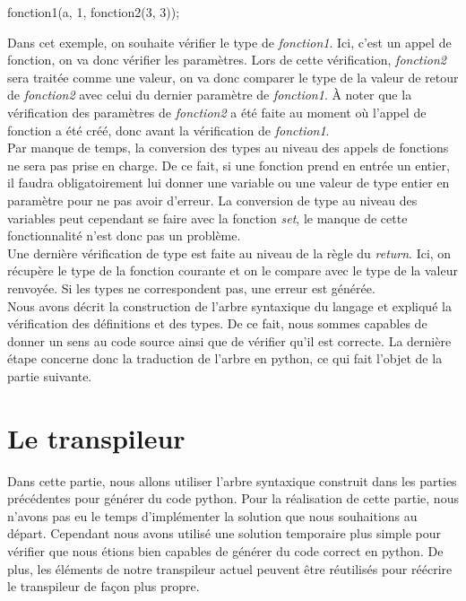 \documentclass[a4paper]{article}%
\begin{document}
\begin{grammar}[language=C++]
  fonction1(a, 1, fonction2(3, 3));
\end{grammar}\leavevmode\newline

Dans cet exemple, on souhaite vérifier le type de \textit{fonction1}. Ici,
c'est un appel de fonction, on va donc vérifier les paramètres. Lors de cette
vérification, \textit{fonction2} sera traitée comme une valeur, on va donc
comparer le type de la valeur de retour de \textit{fonction2} avec celui du
dernier paramètre de \textit{fonction1}. À noter que la vérification des
paramètres de \textit{fonction2} a été faite au moment où l'appel de fonction a
été créé, donc avant la vérification de \textit{fonction1}.\\

Par manque de temps, la conversion des types au niveau des appels de fonctions
ne sera pas prise en charge. De ce fait, si une fonction prend en entrée un
entier, il faudra obligatoirement lui donner une variable ou une valeur de type
entier en paramètre pour ne pas avoir d'erreur. La conversion de type au niveau
des variables peut cependant se faire avec la fonction \textit{set}, le manque
de cette fonctionnalité n'est donc pas un problème.\\

Une dernière vérification de type est faite au niveau de la règle du
\textit{return}. Ici, on récupère le type de la fonction courante et on le
compare avec le type de la valeur renvoyée. Si les types ne correspondent pas,
une erreur est générée.\\

Nous avons décrit la construction de l'arbre syntaxique du langage et expliqué
la vérification des définitions et des types. De ce fait, nous sommes capables
de donner un sens au code source ainsi que de vérifier qu'il est correcte. La
dernière étape concerne donc la traduction de l'arbre en python, ce qui fait
l'objet de la partie suivante.

\clearpage
\section{Le transpileur}

Dans cette partie, nous allons utiliser l'arbre syntaxique construit dans les
parties précédentes pour générer du code python. Pour la réalisation de cette
partie, nous n'avons pas eu le temps d'implémenter la solution que nous
souhaitions au départ. Cependant nous avons utilisé une solution temporaire
plus simple pour vérifier que nous étions bien capables de générer du code
correct en python. De plus, les éléments de notre transpileur actuel peuvent
être réutilisés pour réécrire le transpileur de façon plus propre.
\end{document}
